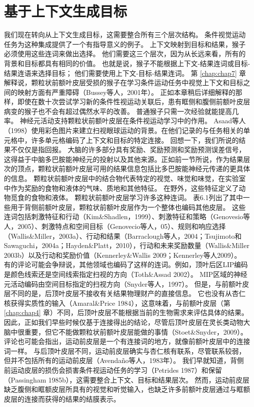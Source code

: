 \section{基于上下文生成目标}

我们现在转向从上下文生成目标，这需要整合所有三个层次结构。
条件视觉运动任务为这种集成提供了一个有指导意义的例子。
上下文映射到目标和结果，猴子必须使用这些连词来做出选择。
他们需要这三个层次，因为从长远来看，所有的背景和目标都具有相同的价值。
也就是说，猴子不能根据上下文-结果连词或目标-结果连语来选择目标；
他们需要使用上下文-目标-结果连词。
第 \ref{chap:chap7} 章解释说，颗粒状前额叶皮层受损的猴子在学习条件运动任务中视觉上下文和目标之间的映射方面有严重障碍（Bussey等人，2001年）。
正如本章稍后详细解释的那样，即使在数十次尝试学习新的条件性视运动关联后，患有眶侧和腹侧前额叶皮层病变的猴子也不会有超过偶然水平的改善。
普通猴子只需一次经验就能提高几率。
神经元活动支持颗粒状前额叶皮层在条件视运动学习中的作用。
Asaad等人（1998）使用彩色图片来建立扫视眼球运动的背景。在他们记录的与任务相关的单元格中，许多单元格编码了上下文和目标的特定连接。
回想一下，我们所说的结果不仅仅是指回报。
大脑的许多部分具有奖励、奖励预测和奖励预测误差信号，这得益于中脑多巴胺能神经元的投射以及其他来源。正如前一节所说，作为结果层次的顶点，颗粒状前额叶皮层可用的结果信息包括比多巴胺能神经元传递的更具体的信息。
颗粒状前额叶皮层中的结合物代表特定的视觉、味觉和味觉，在实验室中作为奖励的食物和液体的气味、质地和其他特征。
在野外，这些特征定义了动物觅食的食物和液体。
颗粒状前额叶皮层学习许多这种连词。
表6.1列出了其中一些用于背侧前额叶皮层，颗粒状前额叶皮层作为一个整体也编码其他皮层。
这些连词包括刺激特征和行动（Kim\&Shadlen，1999）、刺激特征和策略（Genovesio等人，2005）、刺激特点和空间目标（Genovecio等人，05）、规则和响应选择（Wallis\&Miller，2003a）、行动和结果（Barraclough等人，2004；Tsujimoto和Sawaguchi，2004a；Hayden\&Platt，2010），行动和未来奖励数量（Wallis\&Miller 2003b）以及行动和奖励价值（Kennerley\&Wallis 2009；Kennerley等人2009）。
有的评论可能会争辩说，其他领域也编码了这样的连词。例如，顶叶后区LIP编码是颜色线索还是空间线索指定扫视的方向（Toth\&Assad 2002）。
MIP区域的神经元活动编码由空间目标指定的扫视方向（Snyder等人，1997）。
但是，与前额叶皮层不同的是，后顶叶皮层不接收有关结果物理财产的直接信息。
它也没有从杏仁核获得实质性的输入（Amaral\&Price 1984），这意味着，与前额叶皮层（第 \ref{chap:chap4} 章）不同，后顶叶皮层不能根据当前的生物需求来评估具体的结果。
因此，正如我们早些时候仅基于连接得出的结论，尽管后顶叶皮层在灵长类动物大脑中很重要，但它不能做颗粒状前额叶皮层能做的事情（Stoet\&Snyder，2009）。
评论也可能会指出，运动前皮层是一个有连接词的地方，就像前额叶皮层中的连接词一样。
与后顶叶皮层不同，运动前皮层确实与杏仁核有联系，尽管联系较弱，但并不包括所有的运动前皮层（Avendaño等人，1983年）。
我们早就知道，背侧前运动皮层的损伤会损害条件视运动任务的学习（Petrides 1987）和保留（Passingham 1985b），这需要整合上下文、目标和结果层次。
然而，运动前皮层缺乏腹侧和眶额皮层所具有的视觉和听觉输入，也缺乏许多前额叶皮层通过与眶额皮层的连接而获得的结果的结膜表示。


